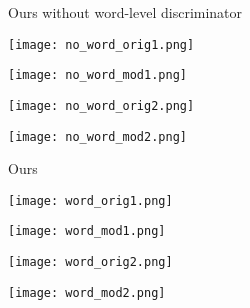 \documentclass{article}
\begin{document}
\begin{figure}[t]
\begin{minipage}{0.48\textwidth}
\noindent\begin{minipage}{0.184\textwidth}
\centering
\tiny{Ours without word-level discriminator}
\end{minipage}
\noindent\begin{minipage}{0.184\textwidth}
\texttt{[image: no\_word\_orig1.png]}
\end{minipage}
\noindent\begin{minipage}{0.184\textwidth}
\texttt{[image: no\_word\_mod1.png]}
\end{minipage}
\noindent\begin{minipage}{0.184\textwidth}
\texttt{[image: no\_word\_orig2.png]}
\end{minipage}
\noindent\begin{minipage}{0.184\textwidth}
\texttt{[image: no\_word\_mod2.png]}
\end{minipage}

\noindent\begin{minipage}{0.184\textwidth}
\centering
\tiny{Ours}
\end{minipage}
\noindent\begin{minipage}{0.184\textwidth}
\texttt{[image: word\_orig1.png]}
\end{minipage}
\noindent\begin{minipage}{0.184\textwidth}
\texttt{[image: word\_mod1.png]}
\end{minipage}
\noindent\begin{minipage}{0.184\textwidth}
\texttt{[image: word\_orig2.png]}
\end{minipage}
\noindent\begin{minipage}{0.184\textwidth}
\texttt{[image: word\_mod2.png]}
\end{minipage}


\end{minipage}
\end{figure}
\end{document}
